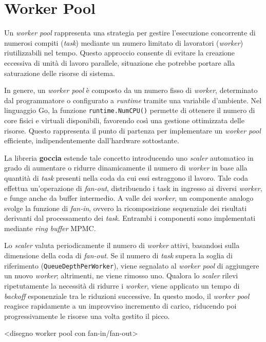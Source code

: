 \section{Worker Pool}

Un \textit{worker pool} rappresenta una strategia per gestire l’esecuzione concorrente di numerosi compiti (\textit{task}) mediante un numero limitato di lavoratori (\textit{worker}) riutilizzabili nel tempo. Questo approccio consente di evitare la creazione eccessiva di unità di lavoro parallele, situazione che potrebbe portare alla saturazione delle risorse di sistema.

In genere, un \textit{worker pool} è composto da un numero fisso di \textit{worker}, determinato dal programmatore o configurato a \textit{runtime} tramite una variabile d’ambiente. Nel linguaggio Go, la funzione \texttt{runtime.NumCPU()} permette di ottenere il numero di core fisici e virtuali disponibili, favorendo così una gestione ottimizzata delle risorse. Questo rappresenta il punto di partenza per implementare un \textit{worker pool} efficiente, indipendentemente dall’hardware sottostante.

La libreria \textbf{goccia} estende tale concetto introducendo uno \textit{scaler} automatico in grado di aumentare o ridurre dinamicamente il numero di \textit{worker} in base alla quantità di \textit{task} presenti nella coda da cui essi estraggono il lavoro. Tale coda effettua un’operazione di \textit{fan-out}, distribuendo i task in ingresso ai diversi \textit{worker}, e funge anche da buffer intermedio. A valle dei \textit{worker}, un componente analogo svolge la funzione di \textit{fan-in}, ovvero la ricomposizione sequenziale dei risultati derivanti dal processamento dei \textit{task}. Entrambi i componenti sono implementati mediante \textit{ring buffer} MPMC.

Lo \textit{scaler} valuta periodicamente il numero di \textit{worker} attivi, basandosi sulla dimensione della coda di \textit{fan-out}. Se il numero di \textit{task} supera la soglia di riferimento (\texttt{QueueDepthPerWorker}), viene segnalato al \textit{worker pool} di aggiungere un nuovo \textit{worker}; altrimenti, ne viene rimosso uno. Qualora lo \textit{scaler} rilevi ripetutamente la necessità di ridurre i \textit{worker}, viene applicato un tempo di \textit{backoff} esponenziale tra le riduzioni successive. In questo modo, il \textit{worker pool} reagisce rapidamente a un improvviso incremento di carico, riducendo poi progressivamente le risorse una volta gestito il picco.

<disegno worker pool con fan-in/fan-out>